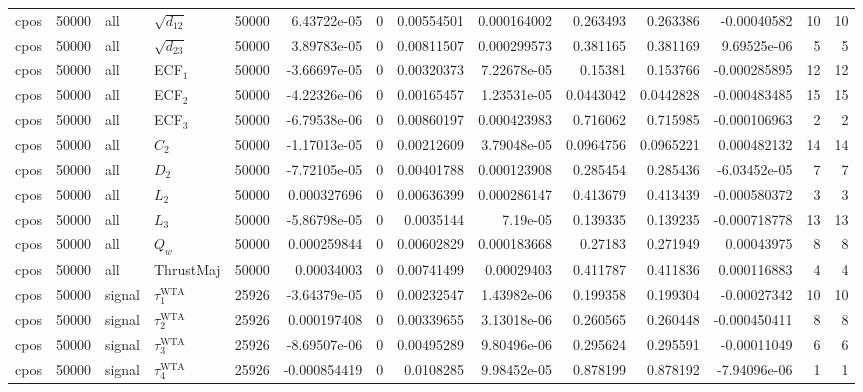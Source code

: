 \begin{landscape}
\begin{longtable}{llll r rrrr rr r rr}
cpos & 50000 & all & $\sqrt{d_{12}}$ & 50000 & 6.43722e-05 & 0 & 0.00554501 & 0.000164002 & 0.263493 & 0.263386 & -0.00040582 & 10 & 10 \\
cpos & 50000 & all & $\sqrt{d_{23}}$ & 50000 & 3.89783e-05 & 0 & 0.00811507 & 0.000299573 & 0.381165 & 0.381169 & 9.69525e-06 & 5 & 5 \\
cpos & 50000 & all & ECF$_1$ & 50000 & -3.66697e-05 & 0 & 0.00320373 & 7.22678e-05 & 0.15381 & 0.153766 & -0.000285895 & 12 & 12 \\
cpos & 50000 & all & ECF$_2$ & 50000 & -4.22326e-06 & 0 & 0.00165457 & 1.23531e-05 & 0.0443042 & 0.0442828 & -0.000483485 & 15 & 15 \\
cpos & 50000 & all & ECF$_3$ & 50000 & -6.79538e-06 & 0 & 0.00860197 & 0.000423983 & 0.716062 & 0.715985 & -0.000106963 & 2 & 2 \\
cpos & 50000 & all & $C_2$ & 50000 & -1.17013e-05 & 0 & 0.00212609 & 3.79048e-05 & 0.0964756 & 0.0965221 & 0.000482132 & 14 & 14 \\
cpos & 50000 & all & $D_2$ & 50000 & -7.72105e-05 & 0 & 0.00401788 & 0.000123908 & 0.285454 & 0.285436 & -6.03452e-05 & 7 & 7 \\
cpos & 50000 & all & $L_2$ & 50000 & 0.000327696 & 0 & 0.00636399 & 0.000286147 & 0.413679 & 0.413439 & -0.000580372 & 3 & 3 \\
cpos & 50000 & all & $L_3$ & 50000 & -5.86798e-05 & 0 & 0.0035144 & 7.19e-05 & 0.139335 & 0.139235 & -0.000718778 & 13 & 13 \\
cpos & 50000 & all & $Q_w$ & 50000 & 0.000259844 & 0 & 0.00602829 & 0.000183668 & 0.27183 & 0.271949 & 0.00043975 & 8 & 8 \\
cpos & 50000 & all & ThrustMaj & 50000 & 0.00034003 & 0 & 0.00741499 & 0.00029403 & 0.411787 & 0.411836 & 0.000116883 & 4 & 4 \\
cpos & 50000 & signal & $\tau_1^{\mathrm{WTA}}$ & 25926 & -3.64379e-05 & 0 & 0.00232547 & 1.43982e-06 & 0.199358 & 0.199304 & -0.00027342 & 10 & 10 \\
cpos & 50000 & signal & $\tau_2^{\mathrm{WTA}}$ & 25926 & 0.000197408 & 0 & 0.00339655 & 3.13018e-06 & 0.260565 & 0.260448 & -0.000450411 & 8 & 8 \\
cpos & 50000 & signal & $\tau_3^{\mathrm{WTA}}$ & 25926 & -8.69507e-06 & 0 & 0.00495289 & 9.80496e-06 & 0.295624 & 0.295591 & -0.00011049 & 6 & 6 \\
cpos & 50000 & signal & $\tau_4^{\mathrm{WTA}}$ & 25926 & -0.000854419 & 0 & 0.0108285 & 9.98452e-05 & 0.878199 & 0.878192 & -7.94096e-06 & 1 & 1 \\

\end{longtable}
\end{landscape}
